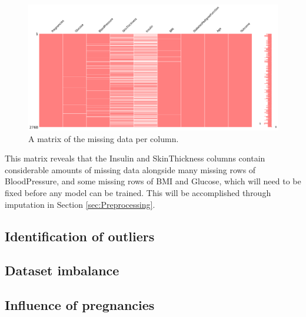 \documentclass[12pt]{report}
\newcommand{\para}{\vspace{8pt}\noindent}
\begin{document}
\begin{figure}[H]
    \centering
    \includegraphics[width=\linewidth]{EDA/Plots/MissingnoMatrix.png}
    \caption{A matrix of the missing data per column.}
    \label{fig:MissingnoMatrix}
\end{figure}


\para This matrix reveals that the Insulin and SkinThickness columns contain considerable amounts of missing data alongside
many missing rows of BloodPressure, and some missing rows of BMI and Glucose, 
which will need to be fixed before any model can be trained. This will be accomplished through imputation in Section 
\ref{sec:Preprocessing}.



\subsection{Identification of outliers}

\subsection{Dataset imbalance}\label{sec:ImbalanceEDA}


\subsection{Influence of pregnancies}
\end{document}
